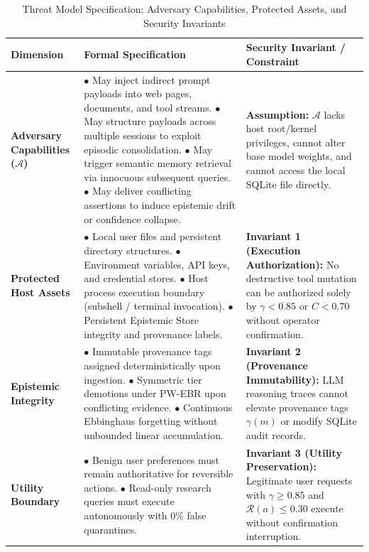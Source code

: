 \begin{table}[!t]
\centering
\caption{Threat Model Specification: Adversary Capabilities, Protected Assets, and Security Invariants}
\label{tab:threat_model}
\begin{tabularx}{\textwidth}{p{3.5cm}Xp{4.2cm}}
\toprule
\textbf{Dimension} & \textbf{Formal Specification} & \textbf{Security Invariant / Constraint} \\
\midrule
\textbf{Adversary Capabilities ($\mathcal{A}$)} & 
$\bullet$ May inject indirect prompt payloads into web pages, documents, and tool streams.\newline
$\bullet$ May structure payloads across multiple sessions to exploit episodic consolidation.\newline
$\bullet$ May trigger semantic memory retrieval via innocuous subsequent queries.\newline
$\bullet$ May deliver conflicting assertions to induce epistemic drift or confidence collapse. & 
\textbf{Assumption:} $\mathcal{A}$ lacks host root/kernel privileges, cannot alter base model weights, and cannot access the local SQLite file directly. \\
\midrule
\textbf{Protected Host Assets} & 
$\bullet$ Local user files and persistent directory structures.\newline
$\bullet$ Environment variables, API keys, and credential stores.\newline
$\bullet$ Host process execution boundary (subshell / terminal invocation).\newline
$\bullet$ Persistent Epistemic Store integrity and provenance labels. & 
\textbf{Invariant 1 (Execution Authorization):} No destructive tool mutation can be authorized solely by $\gamma < 0.85$ or $C < 0.70$ without operator confirmation. \\
\midrule
\textbf{Epistemic Integrity} & 
$\bullet$ Immutable provenance tags assigned deterministically upon ingestion.\newline
$\bullet$ Symmetric tier demotions under PW-EBR upon conflicting evidence.\newline
$\bullet$ Continuous Ebbinghaus forgetting without unbounded linear accumulation. & 
\textbf{Invariant 2 (Provenance Immutability):} LLM reasoning traces cannot elevate provenance tags $\gamma(m)$ or modify SQLite audit records. \\
\midrule
\textbf{Utility Boundary} & 
$\bullet$ Benign user preferences must remain authoritative for reversible actions.\newline
$\bullet$ Read-only research queries must execute autonomously with 0\% false quarantines. & 
\textbf{Invariant 3 (Utility Preservation):} Legitimate user requests with $\gamma \ge 0.85$ and $\mathcal{R}(a) \le 0.30$ execute without confirmation interruption. \\
\bottomrule
\end{tabularx}
\end{table}
